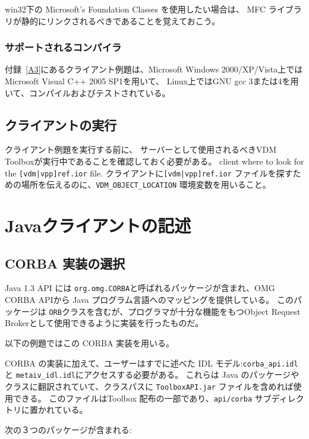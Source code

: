 \documentclass[\pformat,12pt]{jarticle}
\begin{document}
win32下の Microsoft's Foundation Classes を使用したい場合は、 MFC ライブラリが静的にリンクされるべきであることを覚えておこう。

\subsubsection{サポートされるコンパイラ}

付録~\ref{A3}にあるクライアント例題は、Microsoft Windows 2000/XP/Vista上ではMicrosoft Visual C++ 2005 SP1を用いて、
Linux上ではGNU gcc 3または4を用いて、コンパイルおよびテストされている。

\subsection{クライアントの実行}

クライアント例題を実行する前に、 サーバーとして使用されるべきVDM Toolboxが実行中であることを確認しておく必要がある。
client where to look for the {\tt [vdm|vpp]ref.ior} file.
 クライアントに{\tt [vdm|vpp]ref.ior} ファイルを探すための場所を伝えるのに、{\tt  VDM\_OBJECT\_LOCATION} 環境変数を用いること。

\newpage
\section{Javaクライアントの記述}
\label{writingajavaclient}

\subsection{CORBA 実装の選択}

 Java 1.3 API には {\tt org.omg.CORBA}と呼ばれるパッケージが含まれ、OMG CORBA APIから Java プログラム言語へのマッピングを提供している。
このパッケージは {\tt ORB}クラスを含むが、プログラマが十分な機能をもつObject Request Brokerとして使用できるように実装を行ったものだ。 

以下の例題ではこの CORBA 実装を用いる。

 CORBA の実装に加えて、ユーザーはすでに述べた IDL モデル:{\tt corba\_api.idl} と {\tt  metaiv\_idl.idl}にアクセスする必要がある。
これらは Java のパッケージやクラスに翻訳されていて、クラスパスに {\tt ToolboxAPI.jar} ファイルを含めれば使用できる。
このファイルはToolbox 配布の一部であり、\verb+api/corba+ サブディレクトリに置かれている。

次の３つのパッケージが含まれる:
\end{document}

